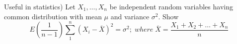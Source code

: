 \documentclass[12pt]{article}
\newenvironment{question}[2][Question]{\begin{trivlist}
\item[\hskip \labelsep {\bfseries #1}\hskip \labelsep {\bfseries #2.}]}{\end{trivlist}}
\begin{document}
\begin{question}{48}
(Useful in statistics) Let $X_1,\ldots,X_n$ be independent random variables having common distribution with mean $\mu$ and variance $\sigma^2$. Show
\[
E(\frac{1}{n-1})\sum_1^n{(X_i - \bar{X})^2} = \sigma^2;\; where\; \bar{X} = \frac{X_1 + X_2 + \ldots + X_n}{n}
\]
\end{question}
 
\end{document}
